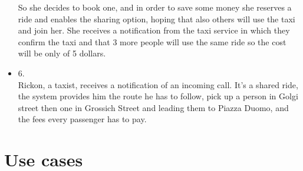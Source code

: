 \begin{itemize}
So she decides to book one, and in order to save some money she reserves a ride and enables the sharing option,
hoping that also others will use the taxi and join her.
She receives a notification from the taxi service in which they confirm the taxi and that 3 more people will use the same ride so the cost will be only of 5 dollars.
\item 6.\\
Rickon, a taxist, receives a notification of an incoming call. It's a shared ride, the system provides him the route he has to follow, pick up a person in Golgi street then 
one in Grossich Street and leading them to Piazza Duomo, and the fees every passenger has to pay.
\end{itemize}

\section {Use cases}
